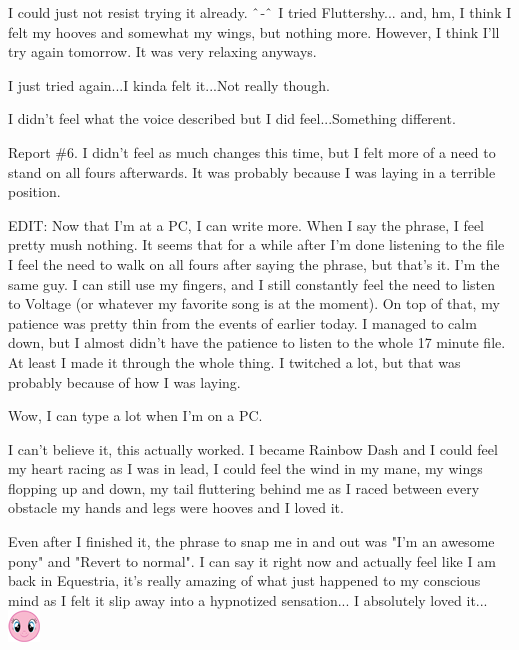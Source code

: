 \documentclass[ebook,12pt,oneside,openany]{memoir}
\newcommand{\carat}{$\char`\^$}
\begin{document}
\begin{tcolorbox}[title=Shaky Novel]
\par{I could just not resist trying it already. \carat{}-\carat{} I tried Fluttershy... and, hm, I think I felt my hooves and somewhat my wings, but nothing more. However, I think I'll try again tomorrow. It was very relaxing anyways. }
\end{tcolorbox}
\begin{tcolorbox}[title=Miss Light Diamond]
\par{I just tried again...I kinda felt it...Not really though.}
\par{I didn't feel what the voice described but I did feel...Something different.}
\end{tcolorbox}
\begin{tcolorbox}[title=Shining Wing,colback=blue!5!white,colframe=blue!75!black,coltitle=white]
\par{Report \#6. I didn't feel as much changes this time, but I felt more of a need to stand on all fours afterwards. It was probably because I was laying in a terrible position.}
\newline{}
\par{EDIT: Now that I'm at a PC, I can write more. When I say the phrase, I feel pretty mush nothing. It seems that for a while after I'm done listening to the file I feel the need to walk on all fours after saying the phrase, but that's it. I'm the same guy. I can still use my fingers, and I still constantly feel the need to listen to Voltage (or whatever my favorite song is at the moment). On top of that, my patience was pretty thin from the events of earlier today. I managed to calm down, but I almost didn't have the patience to listen to the whole 17 minute file. At least I made it through the whole thing. I twitched a lot, but that was probably because of how I was laying.}
\newline{}
\par{Wow, I can type a lot when I'm on a PC.}
\end{tcolorbox}
\begin{tcolorbox}[title=Jordan Dash]
\par{I can't believe it, this actually worked. I became Rainbow Dash and I could feel my heart racing as I was in lead, I could feel the wind in my mane, my wings flopping up and down, my tail fluttering behind me as I raced between every obstacle my hands and legs were hooves and I loved it.}
\newline{}
\par{Even after I finished it, the phrase to snap me in and out was "I'm an awesome pony" and "Revert to normal". I can say it right now and actually feel like I am back in Equestria, it's really amazing of what just happened to my conscious mind as I felt it slip away into a hypnotized sensation... I absolutely loved it... \includegraphics{images/mlp_smile.png} }
\end{tcolorbox}
\end{document}

